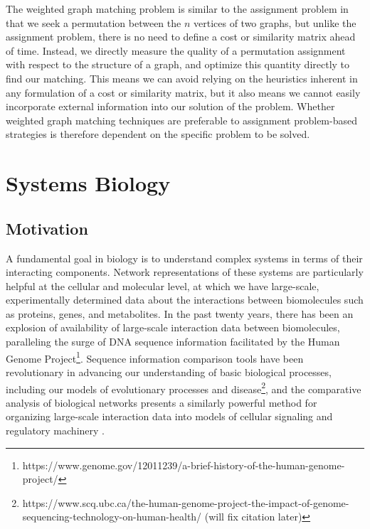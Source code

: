 \documentclass[12pt]{thesis}
\theoremstyle{plain}
\theoremstyle{definition}
\theoremstyle{remark}
\begin{document}
The weighted graph matching problem is similar to the assignment problem in that we seek a permutation between the $n$ vertices of two graphs, but unlike the assignment problem, there is no need to define a cost or similarity matrix ahead of time. Instead, we directly measure the quality of a permutation assignment with respect to the structure of a graph, and optimize this quantity directly to find our matching. This means we can avoid relying on the heuristics inherent in any formulation of a cost or similarity matrix, but it also means we cannot easily incorporate external information into our solution of the problem. Whether weighted graph matching techniques are preferable to assignment problem-based strategies is therefore dependent on the specific problem to be solved.
















\chapter{Systems Biology}\label{chapter:systems_biology}

\section{Motivation}

A fundamental goal in biology is to understand complex systems in terms of their interacting components. Network representations of these systems are particularly helpful at the cellular and molecular level, at which we have large-scale, experimentally determined data about the interactions between biomolecules such as proteins, genes, and metabolites. In the past twenty years, there has been an explosion of availability of large-scale interaction data between biomolecules, paralleling the surge of DNA sequence information facilitated by the Human Genome Project\footnote{https://www.genome.gov/12011239/a-brief-history-of-the-human-genome-project/}. Sequence information comparison tools have been revolutionary in advancing our understanding of basic biological processes, including our models of evolutionary processes and disease\footnote{https://www.scq.ubc.ca/the-human-genome-project-the-impact-of-genome-sequencing-technology-on-human-health/ (will fix citation later)}, and the comparative analysis of  biological networks presents a similarly powerful method for organizing large-scale interaction data into models of cellular signaling and regulatory machinery \cite{Sharan_2005}. 
\end{document}
